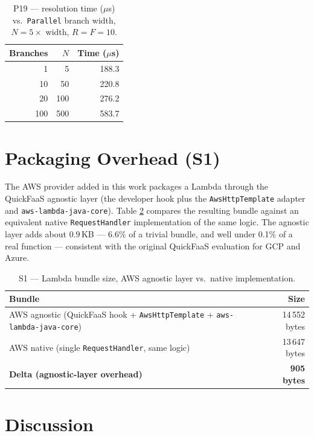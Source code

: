 \begin{table}[htbp]
  \centering
  \caption{P19 --- resolution time ($\mu$s) vs.\ \texttt{Parallel} branch width,
  $N = 5\times$ width, $R{=}F{=}10$.}
  \label{tab:eval-p19}
  \begin{tabular}{rrr}
    \hline
    \textbf{Branches} & \textbf{$N$} & \textbf{Time ($\mu$s)} \\
    \hline
    1   & 5   & 188.3 \\
    10  & 50  & 220.8 \\
    20  & 100 & 276.2 \\
    100 & 500 & 583.7 \\
    \hline
  \end{tabular}
\end{table}

\section{Packaging Overhead (S1)}
\label{sec:eval-bundle}

The AWS provider added in this work packages a Lambda through the QuickFaaS agnostic layer (the
developer hook plus the \texttt{AwsHttpTemplate} adapter and \texttt{aws-lambda-java-core}). Table
\ref{tab:eval-s1} compares the resulting bundle against an equivalent native \texttt{RequestHandler}
implementation of the same logic. The agnostic layer adds about $0.9$\,KB --- 6.6\% of a trivial
bundle, and well under 0.1\% of a real function --- consistent with the original QuickFaaS
evaluation for GCP and Azure.

\begin{table}[htbp]
  \centering
  \caption{S1 --- Lambda bundle size, AWS agnostic layer vs.\ native implementation.}
  \label{tab:eval-s1}
  \begin{tabular}{lr}
    \hline
    \textbf{Bundle} & \textbf{Size} \\
    \hline
    AWS agnostic (QuickFaaS hook + \texttt{AwsHttpTemplate} + \texttt{aws-lambda-java-core}) & 14\,552 bytes \\
    AWS native (single \texttt{RequestHandler}, same logic) & 13\,647 bytes \\
    \textbf{Delta (agnostic-layer overhead)} & \textbf{905 bytes} \\
    \hline
  \end{tabular}
\end{table}

\section{Discussion}
\label{sec:eval-discussion}

